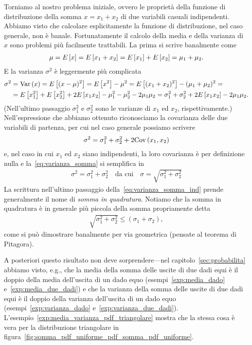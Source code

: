 Torniamo al nostro problema iniziale, ovvero le proprietà della funzione
di distribuzione della somma $x = x_1 + x_2$ di due variabili casuali
indipendenti. Abbiamo visto che calcolare esplicitamente la funzione di
distribuzione, nel caso generale, non è banale. Fortunatamente il calcolo
della media e della varianza di $x$ sono problemi più facilmente
trattabili. La prima si scrive banalmente come
\begin{align}\label{eq:media_somma_ind}
  \mu = \displaystyle E\left[x\right] = \displaystyle E\left[x_1 + x_2\right] = \displaystyle E\left[x_1\right] + \displaystyle E\left[x_2\right] =
  \mu_1 + \mu_2.
\end{align}
E la varianza $\sigma^2$ è leggermente più complicata
\begin{align*}
  \sigma^2 & = \text{Var}\left(x\right) = \displaystyle E\left[(x - \mu)^2\right] = \displaystyle E\left[x^2\right] - \mu^2 =
  \displaystyle E\left[(x_1 + x_2)^2\right] - (\mu_1 + \mu_2)^2 =\\
  & = \displaystyle E\left[x_1^2\right] + \displaystyle E\left[x_2^2\right] + 2\displaystyle E\left[x_1x_2\right] -
  \mu_1^2 - \mu_2^2 - 2\mu_1\mu_2 =
  \sigma_1^2 + \sigma_2^2 + 2\displaystyle E\left[x_1x_2\right] - 2\mu_1\mu_2.
\end{align*}
(Nell'ultimo passaggio $\sigma_1^2$ e $\sigma_2^2$ sono le varianze di $x_1$ ed
$x_2$, rispettivamente.) Nell'espressione che abbiamo ottenuto riconosciamo
la covarianza delle due variabili di partenza, per cui nel caso generale
possiamo scrivere
\begin{align}\label{eq:varianza_somma}
  \sigma^2 =  \sigma_1^2 + \sigma_2^2 + 2\text{Cov}\left(x_1, x_2\right)
\end{align}
e, nel caso in cui $x_1$ ed $x_2$ siano indipendenti, la loro covarianza è
per definizione nulla e la~\eqref{eq:varianza_somma} si semplifica in
\begin{align}\label{eq:varianza_somma_ind}
  \sigma^2 = \sigma_1^2 + \sigma_2^2 \quad \text{da cui} \quad
  \sigma = \sqrt{\sigma_1^2 + \sigma_2^2}
\end{align}
La scrittura nell'ultimo passaggio della~\eqref{eq:varianza_somma_ind} prende
generalmente il nome di \emph{somma in quadratura}. Notiamo che la somma in
quadratura è in generale più piccola della somma propriamente detta
\begin{align*}
  \sqrt{\sigma_1^2 + \sigma_2^2} \leq (\sigma_1 + \sigma_2),
\end{align*}
come si può dimostrare banalmente per via geometrica (pensate al teorema di
Pitagora).

A posteriori questo risultato non deve sorprendere---nel
capitolo~\ref{sec:probabilita} abbiamo visto, e.g., che la media della somma
delle uscite di due dadi equi è il doppio della media dell'uscita di un dado
equo (esempi~\ref{exp:media_dado} e~\ref{exp:media_due_dadi}) e che la varianza
della somma delle uscite di due dadi equi è il doppio della varianza
dell'uscita di un dado equo (esempi~\ref{exp:varianza_dado}
e~\ref{exp:varianza_due_dadi}).
L'esempio~\ref{exp:media_varianza_pdf_triangolare} mostra che la stessa cosa
è vera per la distribuzione triangolare in
figura~\ref{fig:somma_pdf_uniforme_pdf_somma_pdf_uniforme}.

